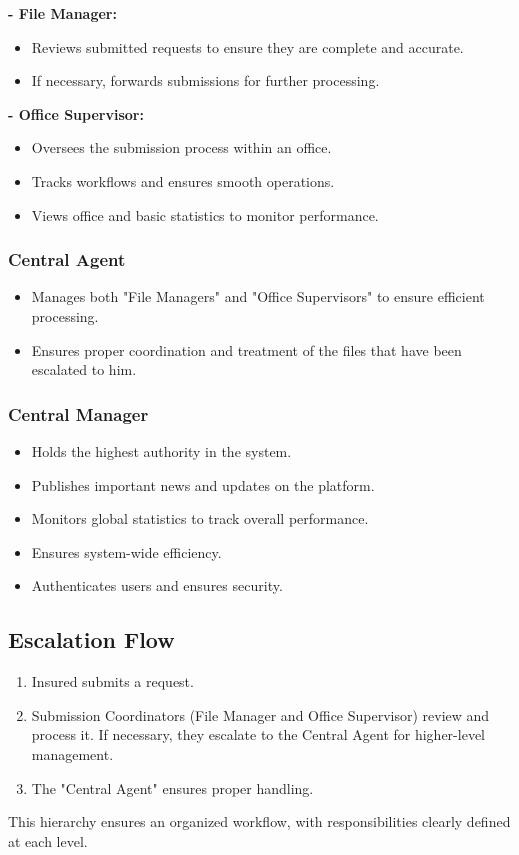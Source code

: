 \textbf{- File Manager:}\\
\begin{itemize}
    \item  Reviews submitted requests to ensure they are complete and accurate.
    \item  If necessary, forwards submissions for further processing.
\end{itemize}

\textbf{- Office Supervisor: } 
\begin{itemize}
    \item  Oversees the submission process within an office.
    \item  Tracks workflows and ensures smooth operations.
    \item  Views office and basic statistics to monitor performance.
\end{itemize}


\subsubsection{ Central Agent} 
\begin{itemize}
    \item  Manages both "File Managers" and "Office Supervisors" to ensure efficient processing.
    \item  Ensures proper coordination and treatment of the files that have been escalated to him.
\end{itemize}

\subsubsection{ Central Manager } 
\begin{itemize}
    \item  Holds the highest authority in the system.
    \item  Publishes important news and updates on the platform.
    \item  Monitors global statistics to track overall performance.
    \item  Ensures system-wide efficiency.
    \item  Authenticates users and ensures security.
\end{itemize}

\subsection{Escalation Flow}  
\begin{enumerate}
    \item Insured submits a request.
    \item Submission Coordinators (File Manager and Office Supervisor) review and process it. If necessary, they escalate to the Central Agent for higher-level management.
    \item The "Central Agent" ensures proper handling.
\end{enumerate}
This hierarchy ensures an organized workflow, with responsibilities clearly defined at each level.
